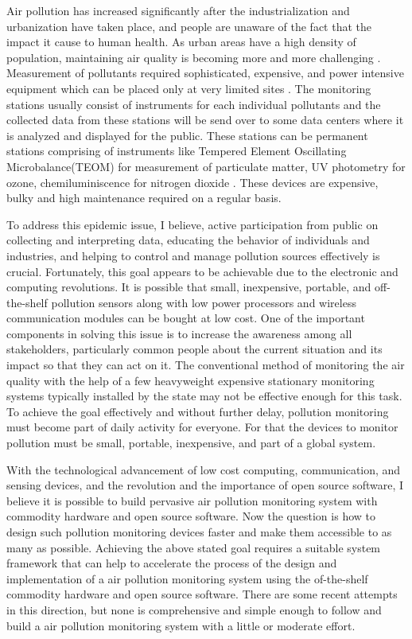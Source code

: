 \documentclass[11pt]{article}
\begin{document}
 Air pollution has increased significantly after the industrialization and urbanization have taken place, and people are unaware of the fact that the impact it cause to human health. As urban areas have a high density of population, maintaining air quality is becoming more and more challenging  \cite{DCRMG17}. Measurement of pollutants required sophisticated, expensive, and power intensive equipment which can be placed only at very limited sites \cite{PXMOC14}. The monitoring stations usually consist of instruments for each individual pollutants and the collected data from these stations will be send over to some data centers where it is analyzed and displayed for the public. These stations can be permanent stations comprising of instruments like Tempered Element Oscillating Microbalance(TEOM) for measurement of particulate matter, UV photometry for ozone, chemiluminiscence for nitrogen dioxide \cite{Gov}. These devices are expensive, bulky and high maintenance required on a regular basis.
	\par				
					To address this epidemic issue, I believe, active participation from public on collecting and interpreting data, educating the behavior of individuals and industries, and helping to control and manage pollution sources effectively is crucial. Fortunately, this goal appears to be achievable due to the electronic and computing revolutions. It is possible that small, inexpensive, portable, and off-the-shelf pollution sensors along with low power processors and wireless communication modules can be bought at low cost. One of the important components in solving this issue is to increase the awareness among all stakeholders, particularly common people about the current situation and its impact so that they can act on it. The conventional method of monitoring the air quality with the help of a few heavyweight expensive stationary monitoring systems typically installed by the state may not be effective enough for this task. To achieve the goal effectively and without further delay, pollution monitoring must become part of daily activity for everyone. For that the devices to monitor pollution must be small, portable, inexpensive, and part of a global system.		
							
\par
					
  With the technological advancement of low cost computing, communication, and sensing devices, and the revolution and the importance of open source software\cite{A16}, I believe it is possible to build pervasive air pollution monitoring system with commodity hardware and open source software. Now the question is how to design such pollution monitoring devices faster and make them accessible to as many as possible.
Achieving the above stated goal requires a suitable system framework that can help to accelerate the process of the design and implementation of a air pollution monitoring system using the of-the-shelf commodity hardware and open source software. There are some recent attempts in this direction, but none is comprehensive and simple enough to follow and build a air pollution monitoring system with a little or moderate effort. 
\newpage
\end{document}
